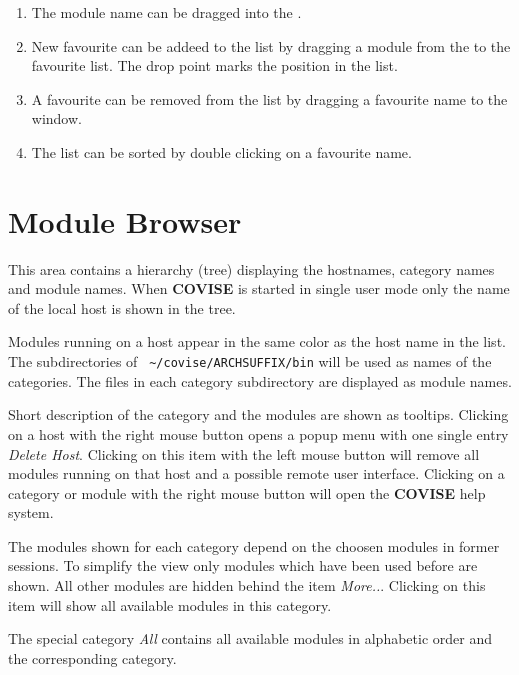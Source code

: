     
	 \begin{enumerate}
	 \item The module name can be dragged into the {\mycanvas}. 
	 \item New favourite can be addeed to the list by dragging a module from the {\mymodulebrowser} to the favourite list. The drop 
    point marks the position in the list. 
	 \item A favourite can be removed from the list by dragging a favourite name to the {\mymodulebrowser} window. 
	 \item The list can be sorted by double clicking on a favourite name.
	 \end{enumerate}
	 


	 \section{Module Browser}
	 \label{modulebrowser}

	 This area contains a hierarchy (tree) displaying the hostnames, category names and module names. When {\bf COVISE} is 
    started in single user mode only the name of the local host is shown in the tree. 
    
    
	 Modules running on a host appear in the same color as the host name in the list. The 
	 subdirectories of \verb+ ~/covise/ARCHSUFFIX/bin+ will be used as names of the categories. The files 
    in each category subdirectory are displayed as module names.  
    
    Short description of the category and the modules are shown as tooltips. Clicking on a 
    host with the right mouse button opens a popup menu with one single entry {\it Delete Host}. Clicking on this 
    item with the left mouse button will remove all modules running on that host and a possible 
    remote user interface. Clicking on a category or module with the right mouse button will open the {\bf COVISE} help system. 
    
    The modules shown for each category depend on the choosen modules in former sessions. To simplify the view 
    only modules which have been used before are shown. All other modules are hidden 
    behind the item {\it More..}. Clicking on this item will show all available modules in this category.
    
    The special category {\it All} contains all available modules in alphabetic order and the corresponding category.
   
